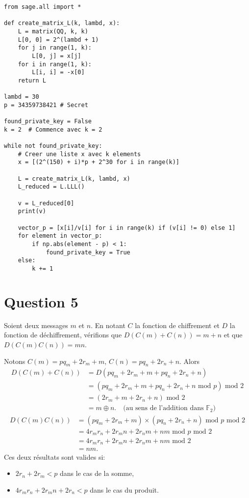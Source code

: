 \documentclass{article}
\newcommand{\bF}{\mathbb{F}}
\begin{document}
\begin{lstlisting}
from sage.all import *

def create_matrix_L(k, lambd, x):
    L = matrix(QQ, k, k)
    L[0, 0] = 2^(lambd + 1)
    for j in range(1, k):
        L[0, j] = x[j]
    for i in range(1, k):
        L[i, i] = -x[0]
    return L

lambd = 30
p = 34359738421 # Secret

found_private_key = False
k = 2  # Commence avec k = 2

while not found_private_key:
    # Creer une liste x avec k elements
    x = [(2^(150) + i)*p + 2^30 for i in range(k)]

    L = create_matrix_L(k, lambd, x)
    L_reduced = L.LLL()
    
    v = L_reduced[0]
    print(v)
    
    vector_p = [x[i]/v[i] for i in range(k) if (v[i] != 0) else 1]
    for element in vector_p:
        if np.abs(element - p) < 1:
            found_private_key = True
    else:
        k += 1
\end{lstlisting}

\section{Question 5}
Soient deux messages $m$ et $n$. En notant $C$ la fonction de chiffrement et $D$ la fonction de déchiffrement, vérifions que $D(C(m)+C(n))=m+n$ et que $D(C(m)C(n))=mn$. 
\par Notons $C(m)=pq_m + 2r_m + m$, $C(n)=pq_n + 2r_n + n$. Alors 
\begin{align*}
    D(C(m)+C(n)) &= D(pq_m + 2r_m + m+pq_n + 2r_n + n) \\
    &= (pq_m + 2r_m + m+pq_n + 2r_n + n \textrm{ mod }p)  \textrm{ mod } 2 \\
    &= (2r_m + m + 2r_n + n) \textrm{ mod } 2 \\
    &= m\oplus n. \quad \text{(au sens de l'addition dans $\bF_2$)}
\end{align*}
\begin{align*}
    D(C(m)C(n))&=(pq_m + 2r_m + m)\times(pq_n + 2r_n + n)\textrm{ mod }p  \textrm{ mod } 2
    \\
    &=4r_m r_n+ 2r_m n + 2r_n m+nm\textrm{ mod }p  \textrm{ mod } 2
    \\
    &=4r_m r_n+ 2r_m n + 2r_n m+nm \textrm{ mod } 2 \\
    &=nm.
\end{align*} 
Ces deux résultats sont valides si:
\begin{itemize}
    \item $2r_n+2r_m<p$ dans le cas de la somme,
    \item $4r_m r_n+ 2r_m n + 2r_n<p$ dans le cas du produit.
\end{itemize}
\end{document}
